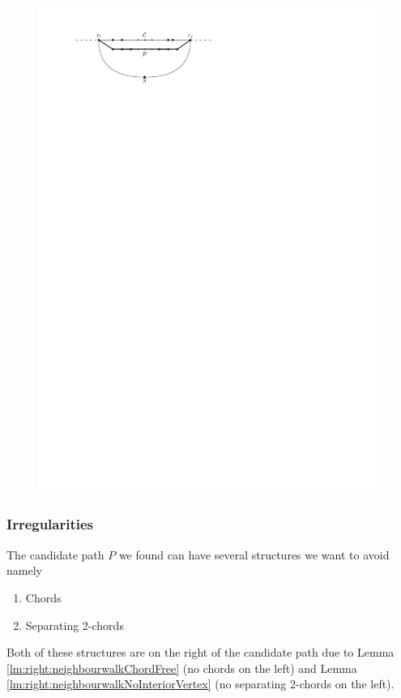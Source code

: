     \begin{figure}[h]
      \centering
      \includegraphics[scale=1]{unifiedAlgo/img/sweep/rightNeighbourWalk}
      \caption{}
      \label{fig:sweep:rightNeighbourwalk}
    \end{figure}

  \subsubsection{Irregularities}
    The candidate path $P$ we found can have several structures we want to avoid
    namely
    \begin{enumerate}
      \itemsep=-4pt
      \item Chords
      \item Separating 2-chords
    \end{enumerate}

    Both of these structures are on the right of the candidate path due to Lemma \ref{lm:right:neighbourwalkChordFree} (no chords on the left) and Lemma \ref{lm:right:neighbourwalkNoInteriorVertex} (no separating 2-chords on the left).

